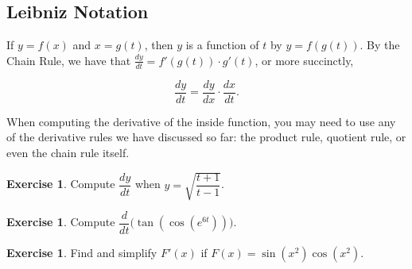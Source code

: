 \documentclass[11pt,reqno,final]{amsart}
\numberwithin{figure}{section}
\theoremstyle{definition} %
\newtheorem{exercise}[question]{Exercise}
\begin{document}
\subsection*{Leibniz Notation}
If $y = f(x)$ and $x = g(t)$, then $y$ is a function of $t$ by $y = f(g(t))$.
By the Chain Rule, we have that
$\frac{dy}{dt} = f'(g(t)) \cdot g'(t)$, or more succinctly,
\begin{framed}
        \[
                \dfrac{dy}{dt} = \dfrac{dy}{dx} \cdot \dfrac{dx}{dt}.
        \]
\end{framed}

When computing the derivative of the inside function, you may need to use any of the derivative rules we have discussed so far:
the product rule, quotient rule, or even the chain rule itself.

\begin{exercise}
        Compute $\dfrac{dy}{dt}$ when $y = \sqrt{\dfrac{t+1}{t-1}}$.
        \vfill
\end{exercise}

\begin{exercise}
        Compute $\dfrac{d}{dt} \Big( \tan(\cos(e^{6t})) \Big)$.
        \vfill
\end{exercise}

\begin{exercise}
        Find and simplify $F'(x)$ if $F(x) = \sin(x^2)\cos(x^2)$.
        \vfill
\end{exercise}
        
\end{document}
